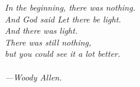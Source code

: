 

\noindent \itshape In the beginning, there was nothing. \\
\itshape And God said \guillemotleft Let there be light\guillemotright. \\
\itshape And there was light. \\
\itshape There was still nothing, \\
\itshape but you could see it a lot better. \\ \\
\hspace{7em} ---Woody Allen.